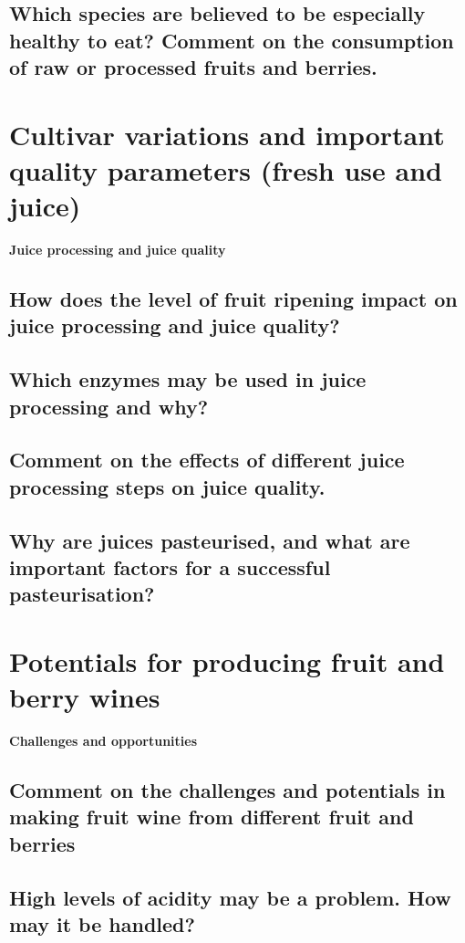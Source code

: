 \subsection{Which species are believed to be especially healthy to eat? Comment on the consumption of raw or processed fruits and berries.}


\vspace{1em}
\section{Cultivar variations and important quality parameters (fresh use and juice)}
\textbf{Juice processing and juice quality}

\subsection{How does the level of fruit ripening impact on juice processing and juice quality?}
\subsection{Which enzymes may be used in juice processing and why?}
\subsection{Comment on the effects of different juice processing steps on juice quality.}
\subsection{Why are juices pasteurised, and what are important factors for a successful pasteurisation?}


\vspace{1em}
\section{Potentials for producing fruit and berry wines }
\textbf{Challenges and opportunities}

\subsection{Comment on the challenges and potentials in making fruit wine from different fruit and berries}
\subsection{High levels of acidity may be a problem. How may it be handled?}

